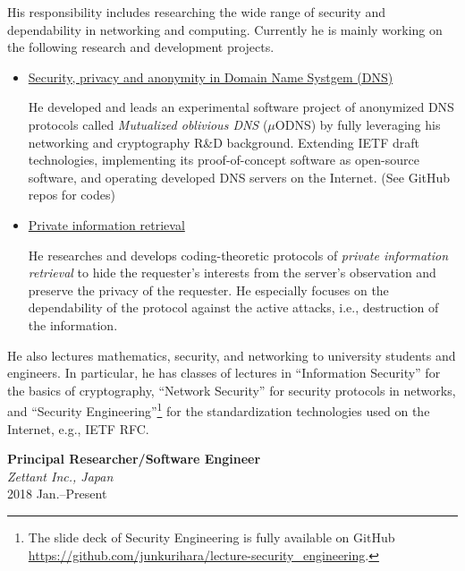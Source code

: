 \hspace*{4ex} His responsibility includes researching the wide range of security and dependability in networking and computing.
Currently he is mainly working on the following research and development projects.
\begin{itemize}
\item \hspace*{4ex} \underline{Security, privacy and anonymity in Domain Name Systgem (DNS)}\\[0.5ex]
\hspace*{6ex}\begin{minipage}{0.9\linewidth}
He developed and leads an experimental software project of anonymized DNS protocols called \textit{Mutualized oblivious DNS} ($\mu$ODNS) by fully leveraging his networking and cryptography R\&D background. Extending IETF draft technologies, implementing its proof-of-concept software as open-source software, and operating developed DNS servers on the Internet. (See GitHub repos for codes)
\end{minipage}
\item \hspace*{4ex} \underline{Private information retrieval}\\[0.5ex]
\hspace*{6ex}\begin{minipage}{0.9\linewidth}
He researches and develops coding-theoretic protocols of \emph{private information retrieval} to hide the requester's interests from the server's observation and preserve the privacy of the requester. He especially focuses on the dependability of the protocol against the active attacks, i.e., destruction of the information.
\end{minipage}
\end{itemize}
He also lectures mathematics, security, and networking to university students and engineers.
In particular, he has classes of lectures in ``Information Security'' for the basics of cryptography, ``Network Security'' for security protocols in networks, and ``Security Engineering''\footnote{The slide deck of Security Engineering is fully available on GitHub \url{https://github.com/junkurihara/lecture-security_engineering}.} for the standardization technologies used on the Internet, e.g., IETF RFC.
\vspace*{2ex}

\textbf{Principal Researcher/Software Engineer}\\
\hspace*{4ex}\textit{Zettant Inc., Japan}\\
\hspace*{4ex}2018 Jan.--Present

